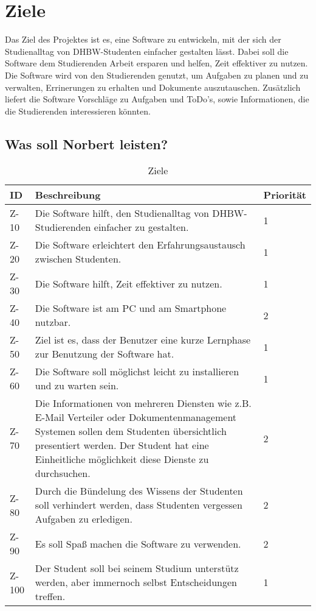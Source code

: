 
\chapter{Ziele}
Das Ziel des Projektes ist es, eine Software zu entwickeln, mit der sich der Studienalltag von DHBW-Studenten einfacher gestalten lässt. Dabei soll die Software dem Studierenden Arbeit ersparen und helfen, Zeit effektiver zu nutzen. Die Software wird von den Studierenden genutzt, um  Aufgaben zu planen und zu verwalten, Errinerungen zu erhalten und Dokumente auszutauschen. Zusätzlich liefert die Software Vorschläge zu Aufgaben und ToDo's, sowie Informationen, die die Studierenden interessieren könnten. 

\section{Was soll Norbert leisten?}
\begin{table}[H]
\caption{Ziele}
\label{ziele:entwicklungsziele}
\begin{tabularx}{\textwidth}{|l|X|l|}
\toprule
\textbf{ID} & \textbf{Beschreibung} & \textbf{Priorität}\\
\endhead
\hline
Z-10 & Die Software hilft, den Studienalltag von DHBW-Studierenden einfacher zu gestalten. & 1 \\
Z-20 & Die Software erleichtert den Erfahrungsaustausch zwischen Studenten. & 1 \\
Z-30 & Die Software hilft, Zeit effektiver zu nutzen. & 1\\
Z-40 & Die Software ist am PC und am Smartphone nutzbar. & 2\\
Z-50 & Ziel ist es, dass der Benutzer eine kurze Lernphase zur Benutzung der Software hat. & 1 \\
Z-60 & Die Software soll möglichst leicht zu installieren und zu warten sein. & 1 \\
Z-70 & Die Informationen von mehreren Diensten wie z.B. E-Mail Verteiler oder Dokumentenmanagement Systemen sollen dem Studenten übersichtlich presentiert werden. Der Student hat eine Einheitliche möglichkeit diese Dienste zu durchsuchen. & 2 \\
Z-80 & Durch die Bündelung des Wissens der Studenten soll verhindert werden, dass Studenten vergessen Aufgaben zu erledigen. & 2 \\
Z-90 & Es soll Spaß machen die Software zu verwenden. & 2 \\
Z-100 & Der Student soll bei seinem Studium unterstütz werden, aber immernoch selbst Entscheidungen treffen. & 1 \\
\hline
\end{tabularx}
\end{table}

